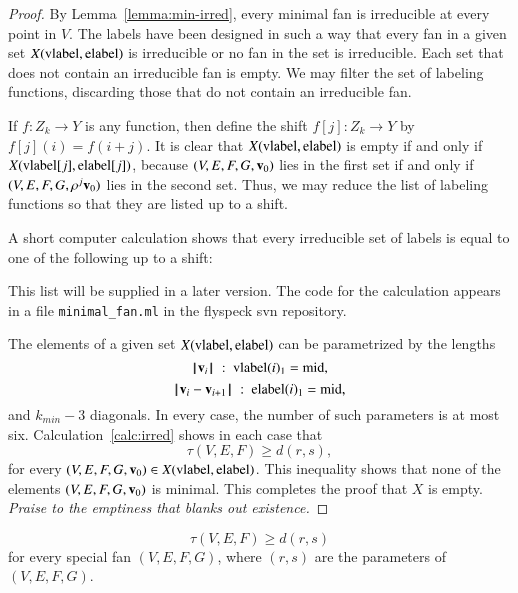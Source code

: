 \begin{proof}
By Lemma~\ref{lemma:min-irred}, every minimal fan is irreducible at every point in $V$.
The labels have been designed in such a way that every fan in a given set
$X({\operatorname{vlabel}},{\operatorname{elabel}})$ is irreducible or no fan in the set is irreducible.
Each set that does not contain an irreducible fan is empty.  We may filter the
set of labeling functions, discarding those that do not contain an irreducible fan.

If $f:Z_k\to Y$ is any function, then define the shift $f[j]:Z_k\to Y$ by
$f[j](i) = f(i+j)$.  It is clear that $X({\operatorname{vlabel}},{\operatorname{elabel}})$ is empty
if and only if $X({\operatorname{vlabel}}[j],{\operatorname{elabel}}[j])$, because $(V,E,F,G,{\mathbf v}_0)$ lies
in the first set if and only if $(V,E,F,G,\rho^j{\mathbf v}_0)$ lies in the second set.  Thus,
we may reduce the list of labeling functions so that they are listed up to a shift.

A short computer calculation shows that every irreducible set of labels is equal
to one of the following up to a shift:

\begin{note}%
This list will be supplied in a later version.  The code for the calculation appears in a file \verb!minimal_fan.ml! in the flyspeck svn repository.
\end{note}

The elements of a given set $X({\operatorname{vlabel}},{\operatorname{elabel}})$ can be parametrized
by the lengths 
$${{\hskip0.1em|\hskip-0.15em|\hskip0.1em}{\mathbf v}_i{\hskip0.1em|\hskip-0.15em|\hskip0.1em}} \ :\  {\operatorname{vlabel}}(i)_1 = {\operatorname{mid}},$$
$${\hskip0.1em|\hskip-0.15em|\hskip0.1em}{\mathbf v}_i - {\mathbf v}_{i+1}{\hskip0.1em|\hskip-0.15em|\hskip0.1em} \ :\  {\operatorname{elabel}}(i)_1 = {\operatorname{mid}},$$
and $k_{min}-3$ diagonals.  In every case, the number of such parameters is
at most six.    Calculation~\ref{calc:irred} %
shows in each case that
$$
\tau(V,E,F) \ge d(r,s),
$$
for every $(V,E,F,G,{\mathbf v}_0)\in X({\operatorname{vlabel}},{\operatorname{elabel}})$.  
This inequality shows that none of the elements $(V,E,F,G,{\mathbf v}_0)$ is minimal.
This completes the proof that $X$ is empty.
{\it Praise to the emptiness that blanks out existence.} %
%
\end{proof}

\begin{corollary}\label{lemma:empty-d}
$$
\tau(V,E,F) \ge d (r,s)
$$
for every special fan $(V,E,F,G)$, where $(r,s)$ are the parameters of $(V,E,F,G)$.
\end{corollary}

